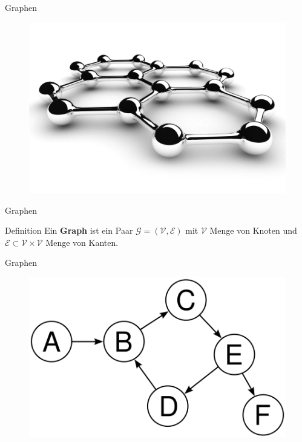 \documentclass[18pt]{beamer}
\begin{document}
\begin{frame}{Graphen}
    \begin{figure}
        \includegraphics[scale=2.5]{img/graph.jpg}
    \end{figure}
\end{frame}

\begin{frame}{Graphen}
    \begin{block}{Definition}
        Ein \textbf{Graph} ist ein Paar $\mathcal{G} = (\mathcal{V}, \mathcal{E})$
        mit $\mathcal{V}$ Menge von Knoten
        und $\mathcal{E} \subset \mathcal{V} \times \mathcal{V}$ Menge von Kanten.
    \end{block}

\end{frame}


\begin{frame}{Graphen}
        \begin{figure}
            \includegraphics[scale=.5]{img/graph.png}
        \end{figure}

\end{frame}
\end{document}
